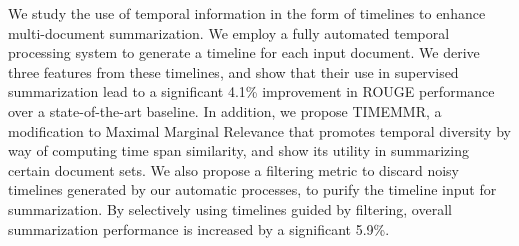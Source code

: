We study the use of temporal information in the form of timelines to enhance multi-document summarization. We employ a fully automated temporal processing system to generate a timeline for each input document. We derive three features from these timelines, and show that their use in supervised summarization lead to a significant 4.1\% improvement in ROUGE performance over a state-of-the-art baseline. In addition, we propose TIMEMMR, a modification to Maximal Marginal Relevance that promotes temporal diversity by way of computing time span similarity, and show its utility in summarizing certain document sets. We also propose a filtering metric to discard noisy timelines generated by our automatic processes, to purify the timeline input for summarization. By selectively using timelines guided by filtering, overall summarization performance is increased by a significant 5.9\%.

